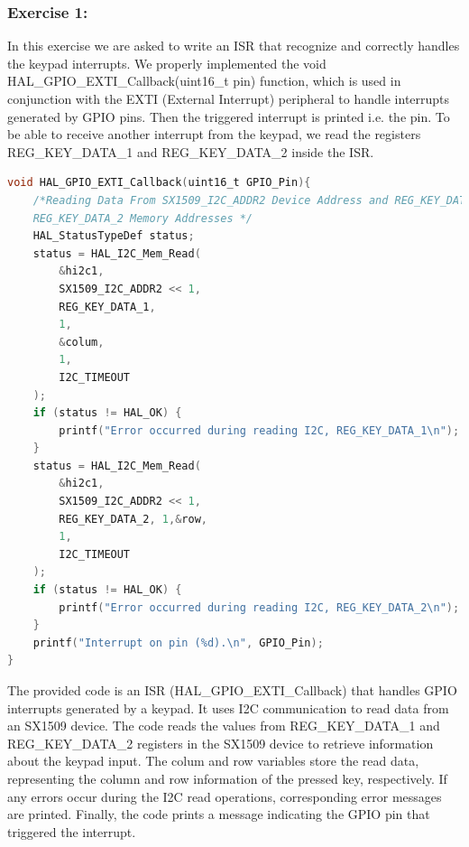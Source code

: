 \documentclass[english]{article}
\begin{document}
\subsubsection{Exercise 1:}
In this exercise we are asked to write an ISR that recognize and correctly handles the keypad interrupts. We properly implemented the void HAL\_GPIO\_EXTI\_Callback(uint16\_t pin) function, which is used in conjunction with the EXTI (External Interrupt) peripheral to handle interrupts generated by GPIO pins. Then the triggered interrupt is printed i.e. the pin. To be able to receive another interrupt from the keypad, we read
the registers REG\_KEY\_DATA\_1 and REG\_KEY\_DATA\_2 inside the ISR.
\begin{lstlisting}[language=C, caption={Interrupt Callback}]
void HAL_GPIO_EXTI_Callback(uint16_t GPIO_Pin){
    /*Reading Data From SX1509_I2C_ADDR2 Device Address and REG_KEY_DATA_1 and 
    REG_KEY_DATA_2 Memory Addresses */
    HAL_StatusTypeDef status;
    status = HAL_I2C_Mem_Read(
        &hi2c1,
        SX1509_I2C_ADDR2 << 1,
        REG_KEY_DATA_1,
        1,
        &colum,
        1,
        I2C_TIMEOUT
    );
    if (status != HAL_OK) {
        printf("Error occurred during reading I2C, REG_KEY_DATA_1\n");
    }
    status = HAL_I2C_Mem_Read(
        &hi2c1,
        SX1509_I2C_ADDR2 << 1,
        REG_KEY_DATA_2, 1,&row,
        1, 
        I2C_TIMEOUT
    );
    if (status != HAL_OK) {
        printf("Error occurred during reading I2C, REG_KEY_DATA_2\n");
    }
    printf("Interrupt on pin (%d).\n", GPIO_Pin);
}
\end{lstlisting}
The provided code is an ISR (HAL\_GPIO\_EXTI\_Callback) that handles 
GPIO interrupts generated by a keypad. It uses I2C communication to 
read data from an SX1509 device. The code reads the values from REG\_KEY\_DATA\_1
 and REG\_KEY\_DATA\_2 registers in the SX1509 device to retrieve information
  about the keypad input. The colum and row variables store the read data,
   representing the column and row information of the pressed key, respectively.
    If any errors occur during the I2C read operations, corresponding error 
    messages are printed. Finally, the code prints a message indicating the 
    GPIO pin that triggered the interrupt.
\newpage
\end{document}
